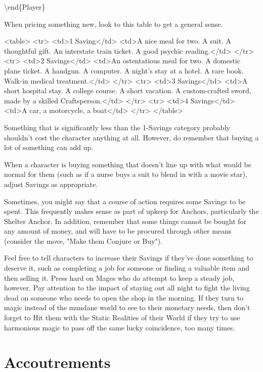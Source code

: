 \documentclass[
  oneside,
  statementpaper,
  9pt]{memoir}
\begin{document}
\textbackslash end\{Player\}

\begin{MC}

When pricing something new, look to this table to get a general sense.

<table>
  <tr>
    <td>1 Saving</td>
    <td>A nice meal for two. A suit. A thoughtful gift. An interstate train ticket. A good psychic reading.</td>
  </tr>
  <tr>
    <td>2 Savings</td>
    <td>An ostentatious meal for two. A domestic plane ticket. A handgun. A computer. A night’s stay at a hotel. A rare book. Walk-in medical treatment.</td>
  </tr>
  <tr>
    <td>3 Savings</td>
    <td>A short hospital stay. A college course. A short vacation. A custom-crafted sword, made by a skilled Craftsperson.</td>
  </tr>
  <tr>
    <td>4 Savings</td>
    <td>A car, a motorcycle, a boat</td>
  </tr>
</table>

Something that is significantly less than the 1-Savings category probably shouldn’t cost the character anything at all. However, do remember that buying a lot of something can add up.

When a character is buying something that doesn’t line up with what would be normal for them (such as if a nurse buys a suit to blend in with a movie star), adjust Savings as appropriate.

Sometimes, you might say that a course of action requires some Savings to be spent. This frequently makes sense as part of upkeep for Anchors, particularly the Shelter Anchor. In addition, remember that some things cannot be bought for any amount of money, and will have to be procured through other means (consider the move, "Make them Conjure or Buy").

Feel free to tell characters to increase their Savings if they've done something to deserve it, such as completing a job for someone or finding a valuable item and then selling it. Press hard on Mages who do attempt to keep a steady job, however. Pay attention to the impact of staying out all night to fight the living dead on someone who needs to open the shop in the morning. If they turn to magic instead of the mundane world to see to their monetary needs, then don't forget to Hit them with the Static Realities of their World if they try to use harmonious magic to pass off the same lucky coincidence, too many times. 

\end{MC}

\hypertarget{accoutrements}{%
\section{Accoutrements}\label{accoutrements}}
\end{document}

